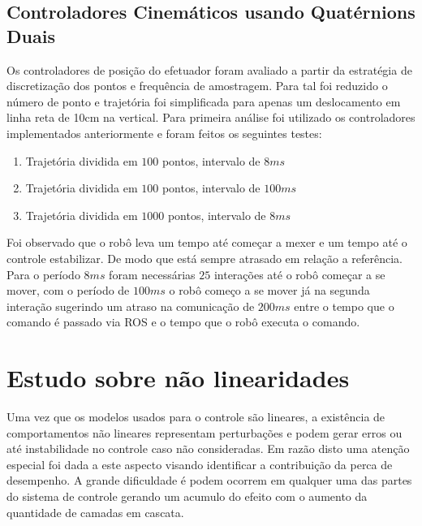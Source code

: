 
\subsection{Controladores Cinemáticos usando Quatérnions Duais}


Os controladores de posição do efetuador foram avaliado a partir da estratégia de discretização dos pontos e frequência de amostragem. Para tal foi reduzido o número de ponto e trajetória foi simplificada para apenas um deslocamento em linha reta de 10cm na vertical. Para primeira análise foi utilizado os controladores implementados anteriormente e foram feitos os seguintes testes:

\begin{enumerate}
    \item Trajetória dividida em $100$ pontos, intervalo de $8 ms$
    \item Trajetória dividida em $100$ pontos, intervalo de $100 ms$
    \item Trajetória dividida em $1000$ pontos, intervalo de $8 ms$
\end{enumerate}

Foi observado que o robô leva um tempo até começar a mexer e um tempo até o controle estabilizar. De modo que está sempre atrasado em relação a referência. Para o período $8 ms$ foram necessárias $25$ interações até o robô começar a se mover, com o período de $100 ms$ o robô começo a se mover já na segunda interação sugerindo um atraso na comunicação de $200 ms$ entre o tempo que o comando é passado via ROS e o tempo que o robô executa o comando.



\section{Estudo sobre não linearidades}


Uma vez que os modelos usados para o controle são lineares, a existência de comportamentos não lineares representam perturbações e podem gerar erros ou até instabilidade no controle caso não consideradas. Em razão disto uma atenção especial foi dada a este aspecto visando identificar a contribuição da perca de desempenho. A grande dificuldade é podem ocorrem em qualquer uma das partes do sistema de controle gerando um acumulo do efeito com o aumento da quantidade de camadas em cascata.

